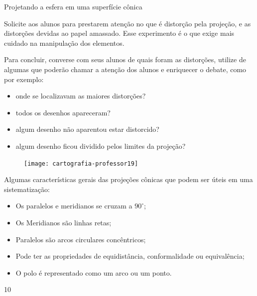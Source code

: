 \begin{sugestions}{Projetando a esfera em uma superfície cônica}
{


  Solicite aos alunos para prestarem atenção no que é distorção pela projeção, e as distorções devidas ao papel amassado. Esse experimento é o que exige mais cuidado na manipulação dos elementos.

  Para concluir, converse com seus alunos de quais foram as distorções, utilize de algumas que poderão chamar a atenção dos alunos e enriquecer o debate, como por exemplo:

  \begin{itemize}
  \item onde se localizavam as maiores distorções?
  \item todos os desenhos apareceram?
  \item algum desenho não aparentou estar distorcido?
  \item algum desenho ficou dividido pelos limites da projeção?
  \end{itemize}

  \begin{figure}[H]
  \centering
  
  \texttt{[image: cartografia-professor19]}
  \end{figure}


  Algumas características gerais das projeções cônicas  que  podem ser úteis em uma sistematização:
  \begin{itemize}
  \item Os paralelos e meridianos se cruzam a $90^{\circ}$;
  \item Os Meridianos são linhas retas;
  \item Paralelos são arcos circulares concêntricos;
  \item Pode ter as propriedades de equidistância, conformalidade ou equivalência;
  \item O polo é representado como um arco ou um ponto.
  \end{itemize}
}{1}{0}
\end{sugestions}


\label{Pconica}

